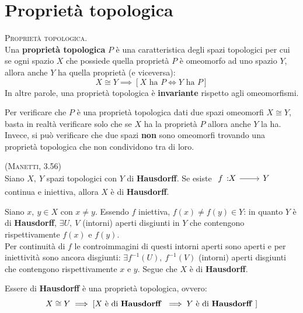 \section{Proprietà topologica}
\begin{define}\textsc{Proprietà topologica.}\\
Una \textbf{proprietà topologica} $P$ è una caratteristica degli spazi topologici per cui se ogni spazio $X$ che possiede quella proprietà $P$ è omeomorfo ad uno spazio $Y$, allora anche $Y$ ha quella proprietà (e viceversa):
\begin{equation}
X\cong Y\implies \left[ X\text{ ha }P\iff Y\text{ ha }P\right]
\end{equation}
In altre parole, una proprietà topologica è \textbf{invariante} rispetto agli omeomorfismi.
\end{define}
\begin{observe}
Per verificare che $P$ è una proprietà topologica dati due spazi omeomorfi $X\cong Y$, basta in realtà verificare solo che se $X$ ha la proprietà $P$ allora anche $Y$ la ha.\\
Invece, si può verificare che due spazi \textbf{non} sono omeomorfi trovando una proprietà topologica che non condividono tra di loro.
\end{observe}
\begin{exercise}\label{hausexercise}\textsc{(Manetti, 3.56)}\\
Siano $X,\ Y$ spazi topologici con $Y$ di \textbf{Hausdorff}. Se esiste $\funz{f}{X}{Y}$ continua e iniettiva, allora $X$ è di \textbf{Hausdorff}.
\end{exercise}
\begin{demonstration}
Siano $x,\ y\in X$ con $x\neq y$. Essendo $f$ iniettiva, $f\left(x\right)\neq f\left(y\right)\in Y$: in quanto $Y$ è di \textbf{Hausdorff}, $\exists U,\ V$ (intorni) aperti disgiunti in $Y$ che contengono rispettivamente $f\left(x\right)$ e $f\left(y\right)$.\\
Per continuità di $f$ le controimmagini di questi intorni aperti sono aperti e per iniettività sono ancora disgiunti: $\exists f^{-1}\left(U\right),\ f^{-1}\left(V\right)$ (intorni) aperti disgiunti che contengono rispettivamente $x$ e $y$. Segue che $X$ è di \textbf{Hausdorff}.
\end{demonstration}
\begin{proposition}
Essere di \textbf{Hausdorff} è una proprietà topologica, ovvero:
\begin{equation}
	X\cong Y\implies \left[ X\text{ è di \textbf{Hausdorff} }\implies Y\text{ è di \textbf{Hausdorff} }\right]
\end{equation}
\vspace{-6mm}
\end{proposition}

